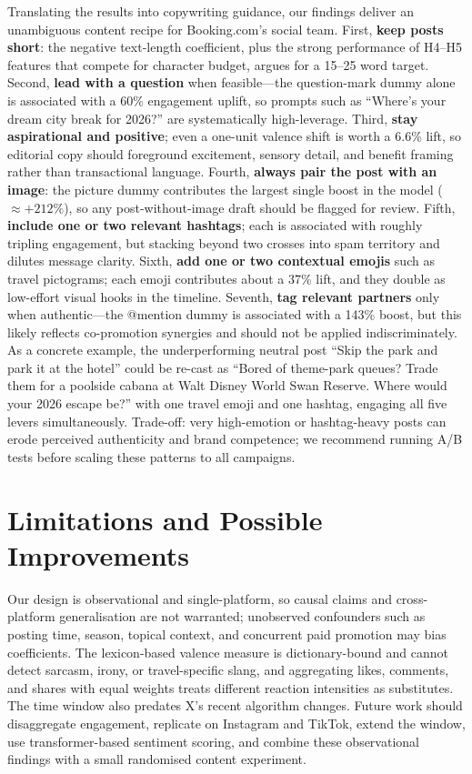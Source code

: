 \documentclass[12pt,a4paper]{article}
\begin{document}
Translating the results into copywriting guidance, our findings deliver an unambiguous content recipe for Booking.com's social team. First, \textbf{keep posts short}: the negative text-length coefficient, plus the strong performance of H4--H5 features that compete for character budget, argues for a 15--25 word target. Second, \textbf{lead with a question} when feasible---the question-mark dummy alone is associated with a 60\% engagement uplift, so prompts such as ``Where's your dream city break for 2026?'' are systematically high-leverage. Third, \textbf{stay aspirational and positive}; even a one-unit valence shift is worth a 6.6\% lift, so editorial copy should foreground excitement, sensory detail, and benefit framing rather than transactional language. Fourth, \textbf{always pair the post with an image}: the picture dummy contributes the largest single boost in the model ($\approx +212\%$), so any post-without-image draft should be flagged for review. Fifth, \textbf{include one or two relevant hashtags}; each is associated with roughly tripling engagement, but stacking beyond two crosses into spam territory and dilutes message clarity. Sixth, \textbf{add one or two contextual emojis} such as travel pictograms; each emoji contributes about a 37\% lift, and they double as low-effort visual hooks in the timeline. Seventh, \textbf{tag relevant partners} only when authentic---the @mention dummy is associated with a 143\% boost, but this likely reflects co-promotion synergies and should not be applied indiscriminately. As a concrete example, the underperforming neutral post ``Skip the park and park it at the hotel'' could be re-cast as ``Bored of theme-park queues? Trade them for a poolside cabana at Walt Disney World Swan Reserve. Where would your 2026 escape be?'' with one travel emoji and one hashtag, engaging all five levers simultaneously. Trade-off: very high-emotion or hashtag-heavy posts can erode perceived authenticity and brand competence; we recommend running A/B tests before scaling these patterns to all campaigns.

\section{Limitations and Possible Improvements}

Our design is observational and single-platform, so causal claims and cross-platform generalisation are not warranted; unobserved confounders such as posting time, season, topical context, and concurrent paid promotion may bias coefficients. The lexicon-based valence measure is dictionary-bound and cannot detect sarcasm, irony, or travel-specific slang, and aggregating likes, comments, and shares with equal weights treats different reaction intensities as substitutes. The time window also predates X's recent algorithm changes. Future work should disaggregate engagement, replicate on Instagram and TikTok, extend the window, use transformer-based sentiment scoring, and combine these observational findings with a small randomised content experiment.
\end{document}
